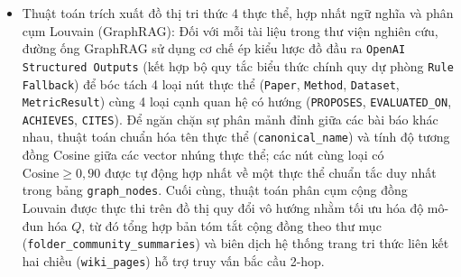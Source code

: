 \begin{itemize}
    \item Thuật toán trích xuất đồ thị tri thức 4 thực thể, hợp nhất ngữ nghĩa và phân cụm Louvain (GraphRAG):
    Đối với mỗi tài liệu trong thư viện nghiên cứu, đường ống GraphRAG sử dụng cơ chế ép kiểu lược đồ đầu ra \texttt{OpenAI Structured Outputs} (kết hợp bộ quy tắc biểu thức chính quy dự phòng \texttt{Rule Fallback}) để bóc tách 4 loại nút thực thể (\texttt{Paper}, \texttt{Method}, \texttt{Dataset}, \texttt{MetricResult}) cùng 4 loại cạnh quan hệ có hướng (\texttt{PROPOSES}, \texttt{EVALUATED\_ON}, \texttt{ACHIEVES}, \texttt{CITES}). Để ngăn chặn sự phân mảnh đỉnh giữa các bài báo khác nhau, thuật toán chuẩn hóa tên thực thể (\texttt{canonical\_\allowbreak name}) và tính độ tương đồng Cosine giữa các vector nhúng thực thể; các nút cùng loại có $\text{Cosine} \ge 0{,}90$ được tự động hợp nhất về một thực thể chuẩn tắc duy nhất trong bảng \texttt{graph\_nodes}. Cuối cùng, thuật toán phân cụm cộng đồng Louvain được thực thi trên đồ thị quy đổi vô hướng nhằm tối ưu hóa độ mô-đun hóa $Q$, từ đó tổng hợp bản tóm tắt cộng đồng theo thư mục (\texttt{folder\_community\_summaries}) và biên dịch hệ thống trang tri thức liên kết hai chiều (\texttt{wiki\_pages}) hỗ trợ truy vấn bắc cầu 2-hop.
\end{itemize}
